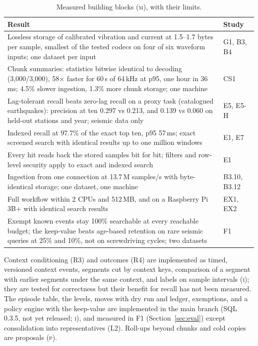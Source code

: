 \documentclass[sigconf,nonacm]{acmart}
\newcommand{\meas}{\textsc{m}}
\newcommand{\impl}{\textsc{i}}
\newcommand{\prop}{\textsc{p}}
\begin{document}
\begin{table}[t]
\caption{Measured building blocks (\meas{}), with their limits.}
\label{tab:evidence}
\small
\begin{tabularx}{\columnwidth}{@{}Xl@{}}
\toprule
Result & Study \\
\midrule
Lossless storage of calibrated vibration and current at 1.5--1.7 bytes per sample, smallest of the tested codecs on four of six waveform inputs; one dataset per input & G1, B3, B4~\cite{g1,b3,b4} \\
Chunk summaries: statistics bitwise identical to decoding (3,000/3,000), 58$\times$ faster for 60\,s of 64\,kHz at p95, one hour in 36\,ms; 4.5\% slower ingestion, 1.3\% more chunk storage; one machine & CS1~\cite{cs1} \\
Lag-tolerant recall beats zero-lag recall on a proxy task (catalogued earthquakes): precision at ten 0.297 vs 0.213, and 0.139 vs 0.060 on held-out stations and year; seismic data only & E5, E5-H~\cite{morletdb} \\
Indexed recall at 97.7\% of the exact top ten, p95 57\,ms; exact screened search with identical results up to one million windows & E1, E7~\cite{morletdb} \\
Every hit reads back the stored samples bit for bit; filters and row-level security apply to exact and indexed search & E1~\cite{morletdb} \\
Ingestion from one connection at 13.7\,M samples/s with byte-identical storage; one dataset, one machine & B3.10, B3.12~\cite{b3} \\
Full workflow within 2 CPUs and 512\,MB, and on a Raspberry Pi 3B+ with identical search results & EX1, EX2~\cite{morletdb} \\
Exempt known events stay 100\% searchable at every reachable budget; the keep-value beats age-based retention on rare seismic queries at 25\% and 10\%, not on screwdriving cycles; two datasets & F1~\cite{f1} \\
\bottomrule
\end{tabularx}
\end{table}

Context conditioning (R3) and outcomes (R4) are implemented as timed, versioned context events, segments cut by context keys, comparison of a segment with earlier segments under the same context, and labels on sample intervals (\impl{}); they are tested for correctness but their benefit for recall has not been measured. The episode table, the levels, moves with dry run and ledger, exemptions, and a policy engine with the keep-value are implemented in the main branch (SQL 0.3.5, not yet released; \impl{}), and measured in F1 (Section~\ref{sec:eval}) except consolidation into representatives (L2). Roll-ups beyond chunks and cold copies are proposals (\prop{}).
\end{document}
